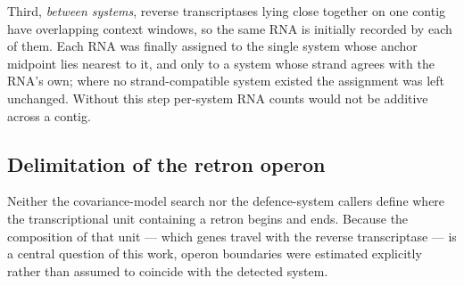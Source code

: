 Third, \emph{between systems}, reverse transcriptases lying close together on one
contig have overlapping context windows, so the same RNA is initially recorded by
each of them. Each RNA was finally assigned to the single system whose anchor
midpoint lies nearest to it, and only to a system whose strand agrees with the RNA's
own; where no strand-compatible system existed the assignment was left unchanged.
Without this step per-system RNA counts would not be additive across a contig.





\subsection{Delimitation of the retron operon}
\label{sec:operon}

Neither the covariance-model search nor the defence-system callers define where the
transcriptional unit containing a retron begins and ends. Because the composition of
that unit --- which genes travel with the reverse transcriptase --- is a central
question of this work, operon boundaries were estimated explicitly rather than
assumed to coincide with the detected system.

